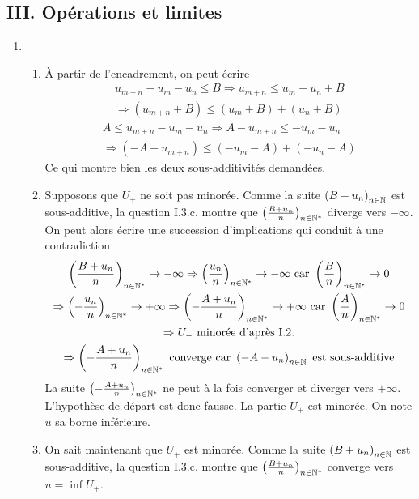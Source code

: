 \subsection*{III. Opérations et limites}
\begin{enumerate}
 \item 
\begin{enumerate}
 \item \`A partir de l'encadrement, on peut écrire
\begin{multline*}
u_{m+n}-u_m-u_n\leq B \Rightarrow
u_{m+n}\leq u_m + u_n + B \\\Rightarrow
(u_{m+n}+B) \leq (u_m+B) + (u_n + B)\end{multline*}
\begin{multline*}
A\leq u_{m+n}-u_m-u_n \Rightarrow
A-u_{m+n} \leq -u_m-u_n \\\Rightarrow
(-A-u_{m+n}) \leq (-u_m-A) + (-u_n-A) 
\end{multline*}
Ce qui montre bien les deux sous-additivités demandées.
 \item Supposons que $U_+$ ne soit pas minorée. Comme la suite $\left( B+u_n\right) _{n\in \mathbb{N}}$ est sous-additive, la question I.3.c. montre que $\left( \frac{B+u_n}{n}\right) _{n\in \mathbb{N}^*}$ diverge vers $-\infty$. On peut alors écrire une succession d'implications qui conduit à une contradiction
\begin{multline*}
 \left( \frac{B+u_n}{n}\right) _{n\in \mathbb{N}^*} \rightarrow -\infty
\Rightarrow 
\left( \frac{u_n}{n}\right) _{n\in \mathbb{N}^*} \rightarrow -\infty \text{ car } \left( \frac{B}{n}\right) _{n\in \mathbb{N}^*}\rightarrow0 \\
\Rightarrow \left( -\frac{u_n}{n}\right) _{n\in \mathbb{N}^*}\rightarrow +\infty 
\Rightarrow \left( -\frac{A+u_n}{n}\right) _{n\in \mathbb{N}^*}\rightarrow +\infty \text{ car }
 \left( \frac{A}{n}\right) _{n\in \mathbb{N}^*}\rightarrow0 \\
\Rightarrow U_-\text{ minorée d'après I.2.}\\
\Rightarrow \left( -\frac{A+u_n}{n}\right) _{n\in \mathbb{N}^*} \text{ converge car }
\left( -A-u_n\right) _{n\in \mathbb{N}}\text{ est sous-additive}
\end{multline*}
La suite $\left( -\frac{A+u_n}{n}\right) _{n\in \mathbb{N}^*}$ ne peut à la fois converger et diverger vers $+\infty$. L'hypothèse de départ est donc fausse. La partie $U_+$ est minorée. On note $u$ sa borne inférieure.
 \item On sait maintenant que $U_+$ est minorée. Comme la suite $\left( B+u_n\right) _{n\in \mathbb{N}}$ est sous-additive, la question I.3.c. montre que $\left( \frac{B+u_n}{n}\right) _{n\in \mathbb{N}^*}$ converge vers $u= \inf U_+$.
\end{enumerate}


\end{enumerate}

